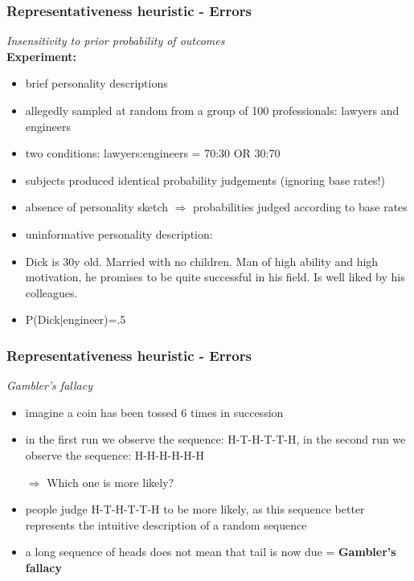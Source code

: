\documentclass[]{beamer}
\begin{document}
\begin{frame}
 \frametitle{Representativeness heuristic - Errors}
\begin{overlayarea}{110mm}{80mm}
\textit{Insensitivity to prior probability of outcomes\\ \vspace{3mm}}
\textbf{Experiment:}
\begin{itemize}
 \item brief personality descriptions
 \item allegedly sampled at random from a group of 100 professionals: lawyers and engineers
 \item two conditions: lawyers:engineers = 70:30 OR 30:70
 \item<2->[$\Rightarrow$] subjects produced identical probability judgements (ignoring base rates!)
 \item<3->[a] absence of personality sketch $\Rightarrow$ probabilities judged according to base rates
 \item<4->[b] uninformative personality description:
 \item<4->[]\begin{tiny} Dick is 30y old. Married with no children. Man of high ability and high motivation, he promises to be quite successful in his field. Is well liked by his colleagues.\end{tiny}
 \item<5->[$\Rightarrow$] P(Dick|engineer)=.5
\end{itemize}
\end{overlayarea}
\end{frame}


\begin{frame}
 \frametitle{Representativeness heuristic - Errors}
\begin{overlayarea}{110mm}{70mm}
\textit{Gambler's fallacy}

\begin{itemize}
 \item imagine a coin has been tossed 6 times in succession
 \item in the first run we observe the sequence: H-T-H-T-T-H, in the second run we observe the sequence: H-H-H-H-H-H
 \item[$\Rightarrow$] Which one is more likely?
 \item<2-> people judge H-T-H-T-T-H to be more likely, as this sequence better represents the intuitive description of a random sequence
 \item<3-> a long sequence of heads does not mean that tail is now due = \textbf{Gambler's fallacy}

\end{itemize}
\end{overlayarea}
\end{frame}
\end{document}
